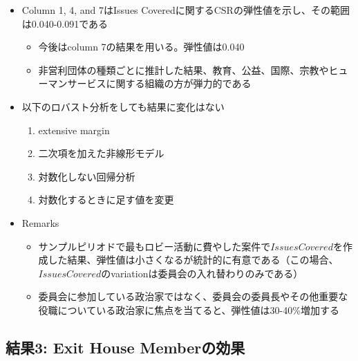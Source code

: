 \documentclass[../root]{subfiles}
\begin{document}
    \begin{itemize}
    
    \item
      Column 1, 4, and 7はIssues Coveredに関するCSRの弾性値を示し、その範囲は0.040-0.091である

      \begin{itemize}
      
      \item
        今後はcolumn 7の結果を用いる。弾性値は0.040
      \item
        非営利団体の種類ごとに推計した結果、教育、公益、国際、宗教やヒューマンサービスに関する組織の方が弾力的である
      \end{itemize}
    \item
      以下のロバスト分析をしても結果に変化はない

      \begin{enumerate}
      \def\labelenumi{\arabic{enumi}.}
      
      \item
        extensive margin
      \item
        二次項を加えた非線形モデル
      \item
        対数化しない回帰分析
      \item
        対数化するときに足す値を変更
      \end{enumerate}
    \item
      Remarks

      \begin{itemize}
      
      \item
        サンプルピリオドで最もロビー活動に費やした案件で\(IssuesCovered\)を作成した結果、弾性値は小さくなるが統計的に有意である（この場合、\(IssuesCovered\)のvariationは委員会の入れ替わりのみである）
      \item
        委員会に参加している政治家ではなく、委員会の委員長やその他重要な役職についている政治家に焦点を当てると、弾性値は30-40\%増加する
      \end{itemize}
    \end{itemize}

    \subsection{結果3: Exit House Memberの効果}\label{ux7d50ux679c3-exit-house-memberux306eux52b9ux679c}
\end{document}
